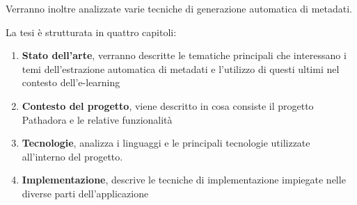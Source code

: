 \vspace{5mm}

Verranno inoltre analizzate varie tecniche di generazione automatica di metadati.

\vspace{5mm}

La tesi è strutturata in quattro capitoli:
\begin{enumerate}
\item \textbf{Stato dell'arte}, verranno descritte le tematiche principali che interessano i temi dell'estrazione automatica di metadati e l'utilizzo di questi ultimi nel contesto dell'e-learning
\item \textbf{Contesto del progetto}, viene descritto in cosa consiste il progetto Pathadora e le relative funzionalità
\item \textbf{Tecnologie}, analizza i linguaggi e le principali tecnologie utilizzate all’interno del progetto.
\item \textbf{Implementazione}, descrive le tecniche di implementazione impiegate nelle diverse parti dell’applicazione
\end{enumerate}

\clearpage{\pagestyle{empty}\cleardoublepage}